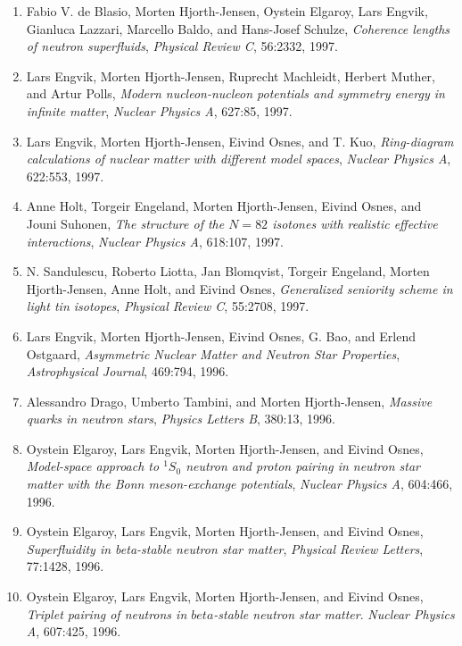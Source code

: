 \documentclass[a4wide,10pt]{article}
\begin{document}
\begin{enumerate}
\item Fabio V. de Blasio, Morten Hjorth-Jensen, Oystein Elgaroy, Lars Engvik,   Gianluca Lazzari, Marcello Baldo, and Hans-Josef Schulze, \emph{Coherence lengths of neutron superfluids},  \emph{Physical Review C}, 56:2332, 1997. 

\item Lars Engvik, Morten Hjorth-Jensen, Ruprecht Machleidt, Herbert Muther, and   Artur Polls, \emph{Modern nucleon-nucleon potentials and symmetry energy in   infinite matter},  \emph{Nuclear Physics A}, 627:85, 1997. 

\item Lars Engvik, Morten Hjorth-Jensen, Eivind Osnes, and T. Kuo, \emph{Ring-diagram calculations of nuclear matter with different model   spaces},  \emph{Nuclear Physics A}, 622:553, 1997. 

\item Anne Holt, Torgeir Engeland, Morten Hjorth-Jensen, Eivind Osnes, and Jouni   Suhonen, \emph{The structure of the $N=82$ isotones with realistic effective   interactions},  \emph{Nuclear Physics A}, 618:107, 1997. 

\item N. Sandulescu, Roberto Liotta, Jan Blomqvist, Torgeir Engeland, Morten   Hjorth-Jensen, Anne Holt, and Eivind Osnes, \emph{Generalized seniority scheme in light tin isotopes},  \emph{Physical Review C}, 55:2708, 1997. 

\item Lars Engvik, Morten Hjorth-Jensen, Eivind Osnes, G. Bao, and Erlend Ostgaard, \emph{Asymmetric Nuclear Matter and Neutron Star Properties},  \emph{Astrophysical Journal}, 469:794, 1996. 

\item Alessandro Drago, Umberto Tambini, and Morten Hjorth-Jensen, \emph{Massive quarks in neutron stars},  \emph{Physics Letters B}, 380:13, 1996. 

\item Oystein Elgaroy, Lars Engvik, Morten Hjorth-Jensen, and Eivind Osnes,  \emph{Model-space approach to $^1S_0$ neutron and proton pairing in   neutron star matter with the Bonn meson-exchange potentials},  \emph{Nuclear Physics A}, 604:466, 1996. 

\item Oystein Elgaroy, Lars Engvik, Morten Hjorth-Jensen, and Eivind Osnes, \emph{Superfluidity in beta-stable neutron star matter},  \emph{Physical Review Letters}, 77:1428, 1996. 

\item Oystein Elgaroy, Lars Engvik, Morten Hjorth-Jensen, and Eivind Osnes, \emph{Triplet pairing of neutrons in $beta$-stable neutron star   matter}.  \emph{Nuclear Physics A}, 607:425, 1996. 


\end{enumerate}
\end{document}
